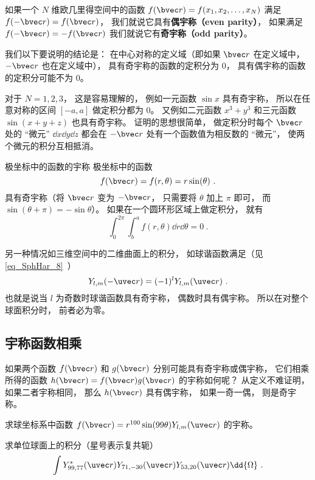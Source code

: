 

如果一个 $N$ 维欧几里得空间中的函数 $f(\bvec r) = f(x_1, x_2, \dots, x_N)$ 满足  $f(-\bvec r) = f(\bvec r)$， 我们就说它具有\textbf{偶宇称（even parity）}， 如果满足  $f(-\bvec r) = -f(\bvec r)$ 我们就说它有\textbf{奇宇称（odd parity）}。

我们以下要说明的结论是： 在中心对称的定义域（即如果 $\bvec r$ 在定义域中， $-\bvec r$ 也在定义域中）， 具有奇宇称的函数的定积分为 0， 具有偶宇称的函数的定积分可能不为 0。

对于 $N = 1, 2, 3$， 这是容易理解的， 例如一元函数 $\sin x$ 具有奇宇称， 所以在任意对称的区间 $[-a, a]$ 做定积分都为 0。 又例如二元函数 $x^3 + y^3$ 和三元函数 $\sin(x + y + z)$ 也具有奇宇称。 证明的思想很简单， 做定积分时每个 $\bvec r$ 处的 “微元” $\dd{x}\dd{y}\dd{z}$ 都会在 $-\bvec r$ 处有一个函数值为相反数的 “微元”， 使两个微元的积分互相抵消。

\begin{example}{极坐标中的函数的宇称}
极坐标中的函数
\begin{equation}\label{eq_IntPry_1}
f(\bvec r) = f(r, \theta) = r\sin(\theta)~.
\end{equation}
具有奇宇称（将 $\bvec r$ 变为 $-\bvec r$， 只需要将 $\theta$ 加上 $\pi$ 即可， 而 $\sin(\theta + \pi) = -\sin\theta$）。 如果在一个圆环形区域上做定积分， 就有
\begin{equation}
\int_0^{2\pi} \int_b^a f(r, \theta) \dd{r} \dd{\theta} = 0~.
\end{equation}
\end{example}

另一种情况如三维空间中的二维曲面上的积分， 如球谐函数满足（见\autoref{eq_SphHar_8}~）
\begin{equation}\label{eq_IntPry_3}
Y_{l,m}(-\uvec r) = (-1)^l Y_{l,m}(\uvec r)~.
\end{equation}
也就是说当 $l$ 为奇数时球谐函数具有奇宇称， 偶数时具有偶宇称。 所以在对整个球面积分时， 前者必为零。

\subsection{宇称函数相乘}
如果两个函数 $f(\bvec r)$ 和 $g(\bvec r)$ 分别可能具有奇宇称或偶宇称， 它们相乘所得的函数 $h(\bvec r) = f(\bvec r) g(\bvec r)$ 的宇称如何呢？ 从定义不难证明， 如果二者宇称相同， 那么 $h(\bvec r)$ 具有偶宇称， 如果一奇一偶， 则是奇宇称。

\begin{exercise}{}
求球坐标系中函数 $f(\bvec r) = r^{100}\sin(99\theta) Y_{l, m}(\uvec r)$ 的宇称。
\end{exercise}

\begin{exercise}{}
求单位球面上的积分（星号表示复共轭）
\begin{equation}
\int Y_{99, 77}^*(\uvec r) Y_{71, -30}(\uvec r) Y_{53, 20}(\uvec r) \dd{\Omega}~.
\end{equation}
\end{exercise}
